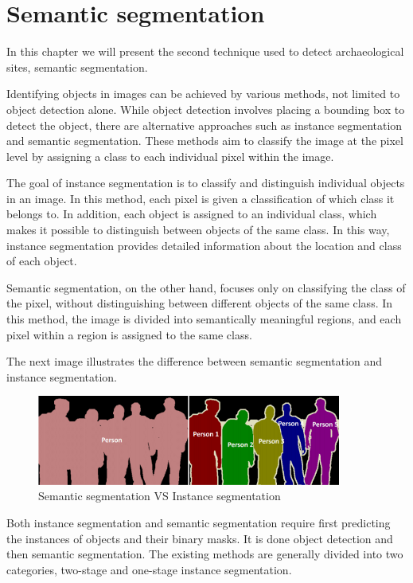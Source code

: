

\chapter{Semantic segmentation}
\label{chapter:unet}

\begin{introduction}
In this chapter we will present the second technique used to detect archaeological sites, semantic segmentation.
\end{introduction}

Identifying objects in images can be achieved by various methods, not limited to object detection alone. While object detection involves placing a bounding box to detect the object, there are alternative approaches such as instance segmentation and semantic segmentation. These methods aim to classify the image at the pixel level by assigning a class to each individual pixel within the image.

The goal of instance segmentation is to classify and distinguish individual objects in an image. In this method, each pixel is given a classification of which class it belongs to. In addition, each object is assigned to an individual class, which makes it possible to distinguish between objects of the same class. In this way, instance segmentation provides detailed information about the location and class of each object.

Semantic segmentation, on the other hand, focuses only on classifying the class of the pixel, without distinguishing between different objects of the same class. In this method, the image is divided into semantically meaningful regions, and each pixel within a region is assigned to the same class.

The next image illustrates the difference between semantic segmentation and instance segmentation.

\begin{figure}[H]
\centering
\includegraphics[width=10cm]{images/semanticVSinstance.png}
\caption{Semantic segmentation VS Instance segmentation \cite{semanticvsinstance}}
\end{figure}


Both instance segmentation and semantic segmentation require first predicting the instances of objects and their binary masks. It is done object detection and then semantic segmentation. The existing methods are generally divided into two categories\cite{instayolo}, two-stage and one-stage instance segmentation.

